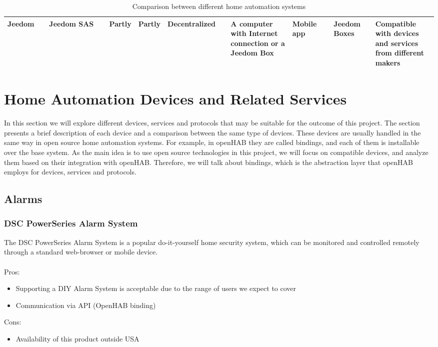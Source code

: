 \begin{table}
\begin{center}
{\begin{tabular}{|p{0.1\linewidth}|p{0.15\linewidth}|p{0.05\linewidth}|p{0.05\linewidth}|p{0.15\linewidth}|p{0.15\linewidth}|p{0.1\linewidth}|p{0.1\linewidth}|p{0.39\linewidth}|}
			Jeedom               & Jeedom SAS                                            & Partly             & Partly           & Decentralized         & A computer with Internet connection or a Jeedom Box & Mobile app                                                     & Jeedom Boxes                          & Compatible with devices and services from different makers                                                      \\ \hline
		\end{tabular}}
		\caption{Comparison between different home automation systems}
		\label{table:home-automation-comparison}
	\end{center}
\end{table}

\bigskip
\section{Home Automation Devices and Related Services}
In this section we will explore different devices, services and protocols that may be suitable for the outcome of this project.
The section presents a brief description of each device and a comparison between the same type of devices. These devices are
usually handled in the same way in open source home automation systems. For example, in openHAB they are called
bindings\cite{openHABDocs}, and each of them is installable over the base system. As the main idea is to use open source technologies
in this project, we will focus on compatible devices, and analyze them based on their integration with openHAB. Therefore, we will talk about
bindings, which is the abstraction layer that openHAB employs for devices, services and protocols.

\subsection{Alarms}

\subsubsection{DSC PowerSeries Alarm System}
The DSC PowerSeries Alarm System is a popular do-it-yourself home security system, which can be monitored and controlled remotely
through a standard web-browser or mobile device.\\~\\
Pros:
\begin{itemize}
	\item Supporting a DIY Alarm System is acceptable due to the range of users we expect to cover
	\item Communication via API (OpenHAB binding)
\end{itemize}
Cons:
\begin{itemize}
	\item Availability of this product outside USA
\end{itemize}

